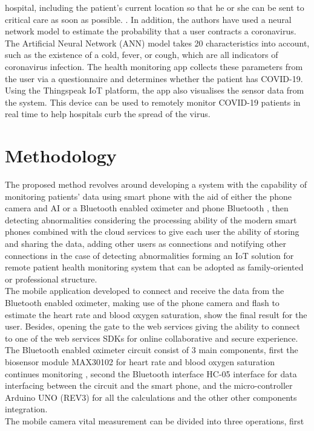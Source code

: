 \documentclass{bmcart}
\begin{document}
hospital, including the patient's current location so that he or she can be sent
to critical care as soon as possible. . In addition, the authors have used a
neural network model to estimate the probability that a user contracts a
coronavirus. The Artificial Neural Network (ANN) model takes 20 characteristics
into account, such as the existence of a cold, fever, or cough, which are all
indicators of coronavirus infection. The health monitoring app collects these
parameters from the user via a questionnaire and determines whether the patient
has COVID-19. Using the Thingspeak IoT platform, the app also visualises the
sensor data from the system. This device can be used to remotely monitor
COVID-19 patients in real time to help hospitals curb the spread of the virus.

\section*{Methodology}
The proposed method revolves around developing a system with the capability of
monitoring patients' data using smart phone with the aid of either the phone
camera and AI or a Bluetooth enabled oximeter and phone Bluetooth , then
detecting abnormalities considering the processing ability of the modern smart
phones combined with the cloud services to give each user the ability of storing
and sharing the data, adding other users as connections and notifying other
connections in the case of detecting abnormalities forming an IoT solution for
remote patient health monitoring system that can be adopted as family-oriented
or professional structure.\\
The mobile application developed to connect and receive the data from the
Bluetooth enabled oximeter, making use of the phone camera and flash to estimate
the heart rate and blood oxygen saturation, show the final result for the user.
Besides, opening the gate to the web services giving the ability to connect to
one of the web services SDKs for online collaborative and secure experience.\\
The Bluetooth enabled oximeter circuit consist of 3 main components, first the
biosensor module MAX30102 for heart rate and blood oxygen saturation continues
monitoring \cite{max30102}, second the Bluetooth interface HC-05 interface for
data interfacing between the circuit and the smart phone, and the
micro-controller Arduino UNO (REV3) for all the calculations and the other other
components integration.\\
The mobile camera vital measurement can be divided into three operations, first
\end{document}
